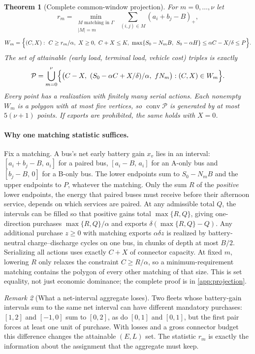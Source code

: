 \documentclass[11pt]{article}
\newtheorem{theorem}{Theorem}
\theoremstyle{definition}\newtheorem{definition}[theorem]{Definition}
\theoremstyle{remark}\newtheorem{remark}[theorem]{Remark}
\newcommand{\conv}{\operatorname{conv}}
\begin{document}
\begin{theorem}[Complete common-window projection]\label{thm:projection}
For $m=0,\dots,\nu$ let
\[
 r_m=\min_{\substack{M\text{ matching in }\Gamma\\ |M|=m}}\ \sum_{(i,j)\in M}(a_i+b_j-B)_+,
\]
\[
 W_m=\Bigl\{(C,X):\ C\ge r_m/\alpha,\ X\ge0,\ C+X\le K,\
 \max\{S_0-N_mB,\ S_0-\alpha H\}\le \alpha C-X/\delta\le P\Bigr\}.
\]
The set of attainable (early load, terminal load, vehicle cost) triples is exactly
\[
 \mathcal P=\bigcup_{m=0}^{\nu}\Bigl\{\bigl(C-X,\ (S_0-\alpha C+X/\delta)/\alpha,\ fN_m\bigr):(C,X)\in W_m\Bigr\}.
\]
Every point has a realization with finitely many serial actions. Each nonempty
$W_m$ is a polygon with at most five vertices, so $\conv\mathcal P$ is generated
by at most $5(\nu+1)$ points. If exports are prohibited, the same holds with $X=0$.
\end{theorem}

\paragraph{Why one matching statistic suffices.}
Fix a matching. A bus's net early battery gain $x_v$ lies in an interval:
$[a_i+b_j-B,\,a_i]$ for a paired bus, $[a_i-B,\,a_i]$ for an A-only bus and
$[b_j-B,\,0]$ for a B-only bus. The lower endpoints sum to $S_0-N_mB$ and the
upper endpoints to $P$, whatever the matching. Only the sum $R$ of the
\emph{positive} lower endpoints, the energy that paired buses must receive
before their afternoon service, depends on which services are paired. At any
admissible total $Q$, the intervals can be filled so that positive gains total
$\max\{R,Q\}$, giving one-direction purchases $\max\{R,Q\}/\alpha$ and
exports $\delta(\max\{R,Q\}-Q)$. Any additional purchase $z\ge0$ with matching
exports $\alpha\delta z$ is realized by battery-neutral charge--discharge cycles
on one bus, in chunks of depth at most $B/2$. Serializing all actions uses exactly
$C+X$ of connector capacity. At fixed $m$, lowering $R$ only relaxes the
constraint $C\ge R/\alpha$, so a minimum-requirement matching contains the polygon of every other
matching of that size. This is set equality, not just economic dominance; the
complete proof is in \cref{app:projection}.

\begin{remark}[What a net-interval aggregate loses]\label{rem:netinterval}
Two fleets whose battery-gain intervals sum to the same net interval can have
different mandatory purchases: $[1,2]$ and $[-1,0]$ sum to $[0,2]$, as do
$[0,1]$ and $[0,1]$, but the first pair forces at least one unit of purchase.
With losses and a gross connector budget this difference changes the attainable
$(E,L)$ set. The statistic $r_m$ is exactly the information about the
assignment that the aggregate must keep.
\end{remark}
\end{document}
